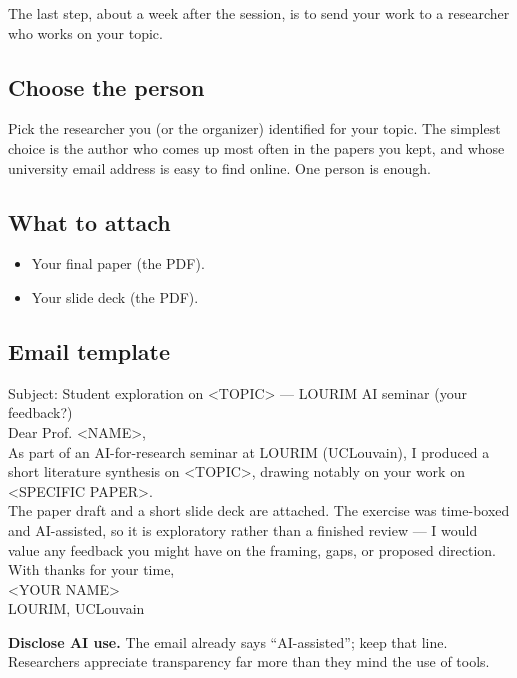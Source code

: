 \documentclass[11pt,a4paper]{article}
\begin{document}
The last step, about a week after the session, is to send your work to a researcher who works on your topic.

\subsection*{Choose the person}
Pick the researcher you (or the organizer) identified for your topic. The simplest choice is the author who comes up most often in the papers you kept, and whose university email address is easy to find online. One person is enough.

\subsection*{What to attach}
\begin{itemize}[leftmargin=*, itemsep=1pt]
  \item Your final paper (the PDF).
  \item Your slide deck (the PDF).
\end{itemize}

\subsection*{Email template}

\begin{promptbox}
Subject: Student exploration on <TOPIC> --- LOURIM AI seminar (your feedback?)\\[4pt]
Dear Prof. <NAME>,\\[2pt]
As part of an AI-for-research seminar at LOURIM (UCLouvain), I produced a short literature synthesis on <TOPIC>, drawing notably on your work on <SPECIFIC PAPER>.\\[2pt]
The paper draft and a short slide deck are attached. The exercise was time-boxed and AI-assisted, so it is exploratory rather than a finished review --- I would value any feedback you might have on the framing, gaps, or proposed direction.\\[2pt]
With thanks for your time,\\
<YOUR NAME>\\
LOURIM, UCLouvain
\end{promptbox}

\begin{watchout}
\textbf{Disclose AI use.} The email already says ``AI-assisted''; keep that line. Researchers appreciate transparency far more than they mind the use of tools.
\end{watchout}
\end{document}
